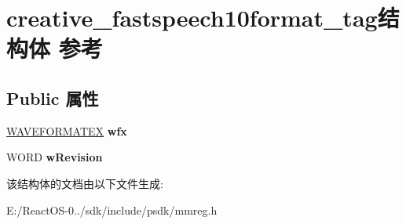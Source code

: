 \hypertarget{structcreative__fastspeech10format__tag}{}\section{creative\+\_\+fastspeech10format\+\_\+tag结构体 参考}
\label{structcreative__fastspeech10format__tag}
\subsection*{Public 属性}
\begin{DoxyCompactItemize}
\item 
\mbox{\label{structcreative__fastspeech10format__tag_af9f7b133c9b210a2b66aaa75f7c85fd9}} 
\hyperlink{struct_w_a_v_e_f_o_r_m_a_t_e_x}{W\+A\+V\+E\+F\+O\+R\+M\+A\+T\+EX} {\bfseries wfx}
\item 
\mbox{\label{structcreative__fastspeech10format__tag_af7bd167ef43fd62539b1da58a3a869d3}} 
W\+O\+RD {\bfseries w\+Revision}
\end{DoxyCompactItemize}


该结构体的文档由以下文件生成\+:\begin{DoxyCompactItemize}
\item 
E\+:/\+React\+O\+S-\/0../sdk/include/psdk/mmreg.\+h\end{DoxyCompactItemize}
